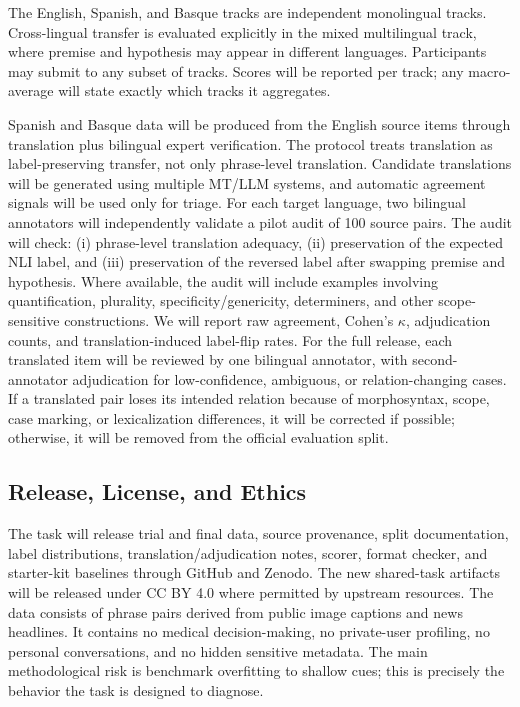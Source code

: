 \documentclass[11pt]{article}
\begin{document}
The English, Spanish, and Basque tracks are independent monolingual tracks.
Cross-lingual transfer is evaluated explicitly in the mixed multilingual track, where premise and hypothesis may appear in different languages.
Participants may submit to any subset of tracks.
Scores will be reported per track; any macro-average will state exactly which tracks it aggregates.

Spanish and Basque data will be produced from the English source items through translation plus bilingual expert verification.
The protocol treats translation as label-preserving transfer, not only phrase-level translation.
Candidate translations will be generated using multiple MT/LLM systems, and automatic agreement signals will be used only for triage.
For each target language, two bilingual annotators will independently validate a pilot audit of 100 source pairs.
The audit will check: (i) phrase-level translation adequacy, (ii) preservation of the expected NLI label, and (iii) preservation of the reversed label after swapping premise and hypothesis.
Where available, the audit will include examples involving quantification, plurality, specificity/genericity, determiners, and other scope-sensitive constructions.
We will report raw agreement, Cohen's \(\kappa\), adjudication counts, and translation-induced label-flip rates.
For the full release, each translated item will be reviewed by one bilingual annotator, with second-annotator adjudication for low-confidence, ambiguous, or relation-changing cases.
If a translated pair loses its intended relation because of morphosyntax, scope, case marking, or lexicalization differences, it will be corrected if possible; otherwise, it will be removed from the official evaluation split.

\subsection{Release, License, and Ethics}

The task will release trial and final data, source provenance, split documentation, label distributions, translation/adjudication notes, scorer, format checker, and starter-kit baselines through GitHub and Zenodo.
The new shared-task artifacts will be released under CC BY 4.0 where permitted by upstream resources.
The data consists of phrase pairs derived from public image captions and news headlines.
It contains no medical decision-making, no private-user profiling, no personal conversations, and no hidden sensitive metadata.
The main methodological risk is benchmark overfitting to shallow cues; this is precisely the behavior the task is designed to diagnose.
\end{document}
